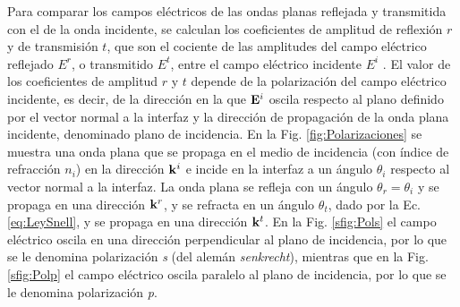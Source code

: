  Para comparar los campos eléctricos de las ondas planas reflejada y transmitida con el de la onda incidente, se calculan  los coeficientes de amplitud de reflexión $r$ y de transmisión $t$, que son el cociente de las amplitudes del campo eléctrico reflejado $E^r$, o transmitido $E^t$, entre el campo eléctrico incidente $E^i$ . El valor de los coeficientes de amplitud $r$ y $t$ depende de la polarización del campo eléctrico incidente, es decir, de la dirección en la que $\vb{E}^i$ oscila respecto al plano definido por el vector normal a la interfaz y la dirección de propagación de la onda plana incidente, denominado plano de incidencia. En la Fig. \ref{fig:Polarizaciones} se muestra una onda plana que se propaga en el medio de incidencia (con índice de refracción $n_i$) en la dirección $\vb{k}^i$ e incide en la interfaz a un ángulo $\theta_i$ respecto al vector normal a la interfaz. La onda plana se refleja con un ángulo $\theta_r = \theta_i$ y se propaga en una dirección $\vb{k}^r$, y se refracta en un ángulo $\theta_t$, dado por la Ec. \eqref{eq:LeySnell}, y se propaga en una dirección $\vb{k}^t$. En la Fig. \ref{sfig:Pols} el campo eléctrico oscila en una dirección perpendicular al plano de incidencia, por lo que se le denomina polarización \emph{s} (del alemán \emph{senkrecht}), mientras que en la Fig. \ref{sfig:Polp} el campo eléctrico oscila paralelo al plano de incidencia, por lo que se le denomina polarización \emph{p}.
%
